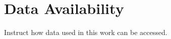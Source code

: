 \section*{Data Availability}
\label{sec:dataavail}

Instruct how data used in this work can be accessed.